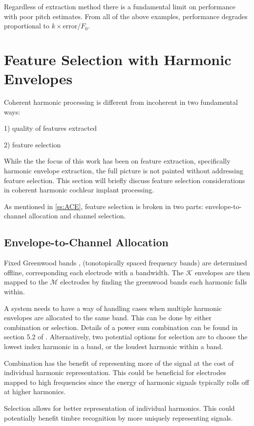 \documentclass [11pt, proquest,oneside] {ganter_thesis}[2015/03/03]
\begin{document}
Regardless of extraction method there is a fundamental limit on performance with poor pitch estimates.  From all of the above examples, performance degrades proportional to $k \times \mathrm{error} / F_0$.

\section{Feature Selection with Harmonic Envelopes}

Coherent harmonic processing is different from incoherent in two fundamental ways:

1) quality of features extracted

2) feature selection

While the the focus of this work has been on feature extraction, specifically harmonic envelope extraction, the full picture is not painted without addressing feature selection.  This section will briefly discuss feature selection considerations in coherent harmonic cochlear implant processing.

As mentioned in \ref{ss:ACE}, feature selection is broken in two parts: envelope-to-channel allocation and channel selection.

\subsection{Envelope-to-Channel Allocation}

Fixed Greenwood bands \cite{greenwood1961critical}, (tonotopically spaced frequency bands) are determined offline, corresponding each electrode with a bandwidth.  The $\mathcal{K}$ envelopes are then mapped to the $\mathcal{M}$ electrodes by finding the greenwood bands each harmonic falls within.

A system needs to have a way of handling cases when multiple harmonic envelopes are allocated to the same band.  This can be done by either combination or selection.  Details of a power sum combination can be found in section 5.2 of \cite{laneau2005deaf}.  Alternatively, two potential options for selection are to choose the lowest index harmonic in a band, or the loudest harmonic within a band.

Combination has the benefit of representing more of the signal at the cost of individual harmonic representation. This could be beneficial for electrodes mapped to high frequencies since the energy of harmonic signals typically rolls off at higher harmonics.

Selection allows for better representation of individual harmonics.  This could potentially benefit timbre recognition by more uniquely representing signals.
\end{document}
